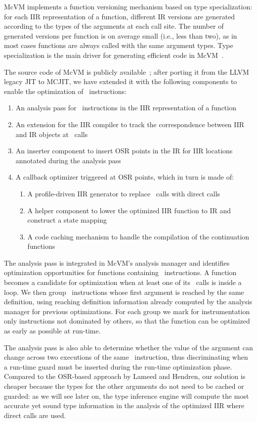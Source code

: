 McVM implements a function versioning mechanism based on type specialization: for each IIR representation of a function, different IR versions are generated according to the types of the arguments at each call site. The number of generated versions per function is on average small (i.e., less than two), as in most cases functions are always called with the same argument types. Type specialization is the main driver for generating efficient code in McVM~\cite{chevalier2010mcvm}.

The source code of McVM is publicly available~\cite{mcvm}; after porting it from the LLVM legacy JIT to MCJIT, we have extended it with the following components to enable the optimization of \feval\ instructions:
\begin{enumerate}
\item An analysis pass for \feval\ instructions in the IIR representation of a function
\item An extension for the IIR compiler to track the correspondence between IIR and IR objects at \feval\ calls
\item An inserter component to insert OSR points in the IR for IIR locations annotated during the analysis pass
\item A callback optimizer triggered at OSR points, which in turn is made of:
\begin{enumerate}
\item A profile-driven IIR generator to replace \feval\ calls with direct calls
\item A helper component to lower the optimized IIR function to IR and construct a state mapping 
\item A code caching mechanism to handle the compilation of the continuation functions
\end{enumerate}
\end{enumerate}

The analysis pass is integrated in McVM's analysis manager and identifies optimization opportunities for functions containing \feval\ instructions. A function becomes a candidate for optimization when at least one of its \feval\ calls is inside a loop. We then group \feval\ instructions whose first argument is reached by the same definition, using reaching definition information already computed by the analysis manager for previous optimizations. For each group we mark for instrumentation only instructions not dominated by others, so that the function can be optimized as early as possible at run-time.

The analysis pass is also able to determine whether the value of the argument can change across two executions of the same \feval\ instruction, thus discriminating when a run-time guard must be inserted during the run-time optimization phase. Compared to the OSR-based approach by Lameed and Hendren, our solution is cheaper because the types for the other arguments do not need to be cached or guarded: as we will see later on, the type inference engine will compute the most accurate yet sound type information in the analysis of the optimized IIR where direct calls are used.


